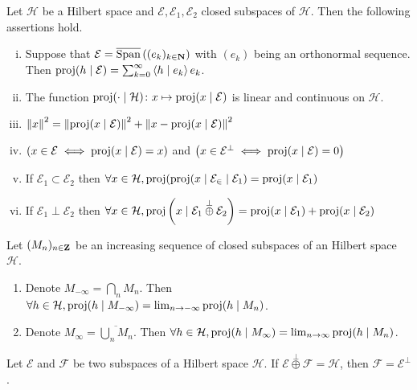 	\begin{pop}
		Let $\mathcal{H}$ be a Hilbert space and $\mathcal{E}, \mathcal{E}_1, \mathcal{E}_2$ closed subspaces of $\mathcal{H}$.
		Then the following assertions hold.
		\begin{enumerate}[(i)]
			\item Suppose that $\mathcal{E} = \overline{\operatorname{Span}} \left( (e_k)_{k \in \mathbf{N}} \right)$ with $(e_k)$ being an orthonormal sequence.
				Then $\operatorname{proj}(h \mid \mathcal{E}) = \sum_{k = 0}^\infty \left\langle h \mid e_k \right\rangle e_k$.
			\item The function $\operatorname{proj}(\cdot \mid \mathcal{H}) \colon x \mapsto \operatorname{proj}(x \mid \mathcal{E})$ is linear and continuous on $\mathcal{H}$.
			\item $\left\lVert x\right\rVert^2 = \left\lVert \operatorname{proj}(x \mid \mathcal{E}) \right\rVert^2 + \left\lVert x - \operatorname{proj}(x \mid \mathcal{E}) \right\rVert^2$
			\item $\left( x \in \mathcal{E} \iff \operatorname{proj}(x \mid \mathcal{E}) = x \right)$ and $\left( x \in \mathcal{E}^\perp \iff \operatorname{proj}(x \mid \mathcal{E}) = 0 \right)$
			\item If $\mathcal{E}_1 \subset \mathcal{E}_2$ then $\forall x \in \mathcal{H}, \operatorname{proj}(\operatorname{proj}(x \mid \mathcal{E_2} \mid \mathcal{E}_1) = \operatorname{proj}(x \mid \mathcal{E}_1)$
			\item If $\mathcal{E}_1 \perp \mathcal{E}_2$ then $\forall x \in \mathcal{H}, \operatorname{proj} \left( x \mid \mathcal{E}_1 \overset\perp\oplus \mathcal{E}_2 \right) = \operatorname{proj}(x \mid \mathcal{E}_1) + \operatorname{proj}(x \mid \mathcal{E}_2)$
		\end{enumerate}
	\end{pop}

	\begin{thm}
		Let $(M_n)_{n \in \mathbf{Z}}$ be an increasing sequence of closed subspaces of an Hilbert space $\mathcal{H}$.
		\begin{enumerate}
			\item Denote $M_{-\infty} = \bigcap_n M_n$. Then $\forall h \in \mathcal{H}, \operatorname{proj}(h \mid M_{-\infty}) = \lim_{n \to -\infty} \operatorname{proj}(h \mid M_n)$.
			\item Denote $M_{\infty} = \overline{\bigcup_n M_n}$. Then $\forall h \in \mathcal{H}, \operatorname{proj}(h \mid M_{\infty}) = \lim_{n \to \infty} \operatorname{proj}(h \mid M_n)$.
		\end{enumerate}
	\end{thm}

	\begin{pop}
		Let $\mathcal{E}$ and $\mathcal{F}$ be two subspaces of a Hilbert space $\mathcal{H}$.
		If $\mathcal{E} \overset\perp\oplus \mathcal{F} = \mathcal{H}$, then $\mathcal{F} = \mathcal{E}^\perp$.
	\end{pop}
	
